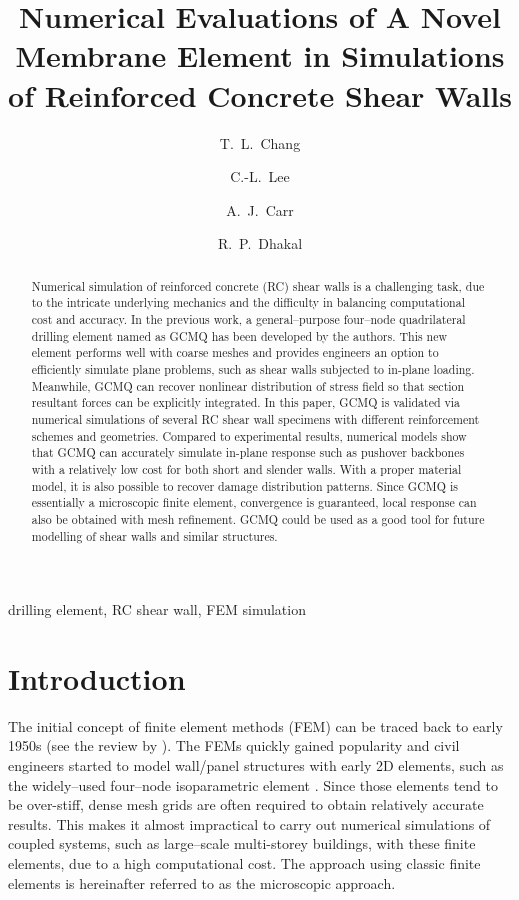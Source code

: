 \documentclass[3p,review,sort&compress,11pt,fleqn]{elsarticle}
\begin{document}
\begin{abstract}
Numerical simulation of reinforced concrete (RC) shear walls is a challenging task, due to the intricate underlying mechanics and the difficulty in balancing computational cost and accuracy. In the previous work, a general--purpose four--node quadrilateral drilling element named as GCMQ has been developed by the authors. This new element performs well with coarse meshes and provides engineers an option to efficiently simulate plane problems, such as shear walls subjected to in-plane loading. Meanwhile, GCMQ can recover nonlinear distribution of stress field so that section resultant forces can be explicitly integrated. In this paper, GCMQ is validated via numerical simulations of several RC shear wall specimens with different reinforcement schemes and geometries. Compared to experimental results, numerical models show that GCMQ can accurately simulate in-plane response such as pushover backbones with a relatively low cost for both short and slender walls. With a proper material model, it is also possible to recover damage distribution patterns. Since GCMQ is essentially a microscopic finite element, convergence is guaranteed, local response can also be obtained with mesh refinement. GCMQ could be used as a good tool for future modelling of shear walls and similar structures.
\end{abstract}
\begin{keyword}
drilling element\sep
{RC} shear wall\sep
{FEM} simulation
\end{keyword}
\begin{frontmatter}
\title{Numerical Evaluations of A Novel Membrane Element in Simulations of Reinforced Concrete Shear Walls}
\author[add1]{T.~L.~Chang}
\author[add1]{C.-L.~Lee}
\author[add1]{A.~J.~Carr}
\author[add1]{R.~P.~Dhakal}
\address[add1]{Department of Civil and Natural Resources Engineering, University of Canterbury, Christchurch, NZ, 8041.}
\end{frontmatter}%
\section{Introduction}
The initial concept of finite element methods (FEM) can be traced back to early 1950s (see the review by \citet{Clough1990}). The FEMs quickly gained popularity and civil engineers started to model wall/panel structures \citep[e.g.,][]{MacLeod1969} with early 2D elements, such as the widely--used four--node isoparametric element \citep{Turner1956}. Since those elements tend to be over-stiff, dense mesh grids are often required to obtain relatively accurate results. This makes it almost impractical to carry out numerical simulations of coupled systems, such as large--scale multi-storey buildings, with these finite elements, due to a high computational cost. The approach using classic finite elements is hereinafter referred to as the microscopic approach.
\end{document}
